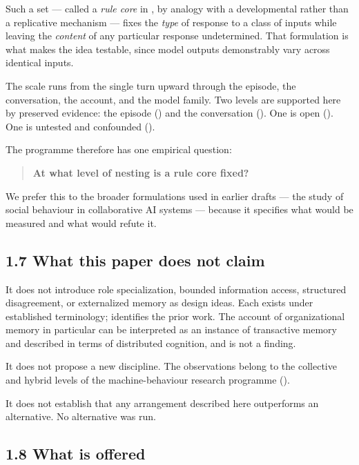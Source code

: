 Such a set — called a \emph{rule core} in , by analogy with a developmental rather than a replicative mechanism — fixes the \emph{type} of response to a class of inputs while leaving the \emph{content} of any particular response undetermined. That formulation is what makes the idea testable, since model outputs demonstrably vary across identical inputs.

The scale runs from the single turn upward through the episode, the conversation, the account, and the model family. Two levels are supported here by preserved evidence: the episode () and the conversation (). One is open (). One is untested and confounded ().

The programme therefore has one empirical question:

\begin{quote}
\textbf{At what level of nesting is a rule core fixed?}
\end{quote}
We prefer this to the broader formulations used in earlier drafts — the study of social behaviour in collaborative AI systems — because it specifies what would be measured and what would refute it.


\subsection*{1.7 What this paper does not claim}
\label{sec:en:1.7}

It does not introduce role specialization, bounded information access, structured disagreement, or externalized memory as design ideas. Each exists under established terminology;  identifies the prior work. The account of organizational memory in particular can be interpreted as an instance of transactive memory and described in terms of distributed cognition, and is not a finding.

It does not propose a new discipline. The observations belong to the collective and hybrid levels of the machine-behaviour research programme ().

It does not establish that any arrangement described here outperforms an alternative. No alternative was run.


\subsection*{1.8 What is offered}
\label{sec:en:1.8}


